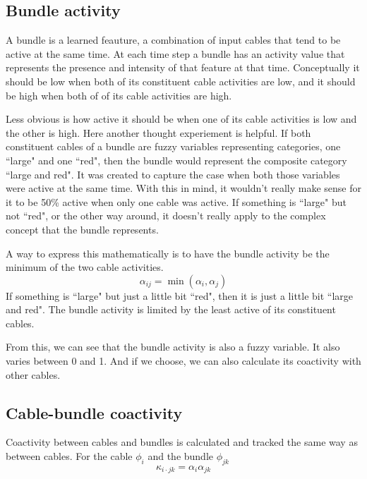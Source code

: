 \subsection{Bundle activity}
\label{subsec:algobundleactivity}

A bundle is a learned feauture, a combination of input cables that
tend to be active at the same time. At each time step a bundle
has an activity value that represents the presence and intensity of that
feature at that time. Conceptually it should be low when both of its
constituent cable activities are low, and it should be high when both of
of its cable activities are high.

Less obvious is how active it should be when one of its cable activities
is low and the other is high. Here another thought experiement is helpful.
If both constituent cables of a bundle are fuzzy variables representing
categories, one ``large" and one ``red", then the bundle would represent
the composite category ``large and red". It was created to capture the
case when both those variables were active at the same time. With this in
mind, it wouldn't really make sense for it to be 50\% active when only 
one cable was active. If something is ``large" but not ``red", or the
other way around, it doesn't really apply to the complex concept
that the bundle represents.

A way to express this mathematically is to have the bundle activity
be the minimum of the two cable activities.
\begin{equation}
\alpha_{ij} = \min(\alpha_i, \alpha_j)
\end{equation}
If something is ``large"
but just a little bit ``red", then it is just a little bit
``large and red". The bundle activity is limited by the least active of
its constituent cables.

From this, we can see that the bundle activity is also a fuzzy variable.
It also varies between 0 and 1. And if we choose, we can also calculate its
coactivity with other cables.

\subsection{Cable-bundle coactivity}
\label{subsec:algocablebundle}

Coactivity between cables and bundles is calculated and tracked the same
way as between cables. For the cable $\phi_i$ and the bundle $\phi_{jk}$
\begin{equation}
\kappa_{i \cdot jk} = \alpha_i \alpha_{jk}
\end{equation}

